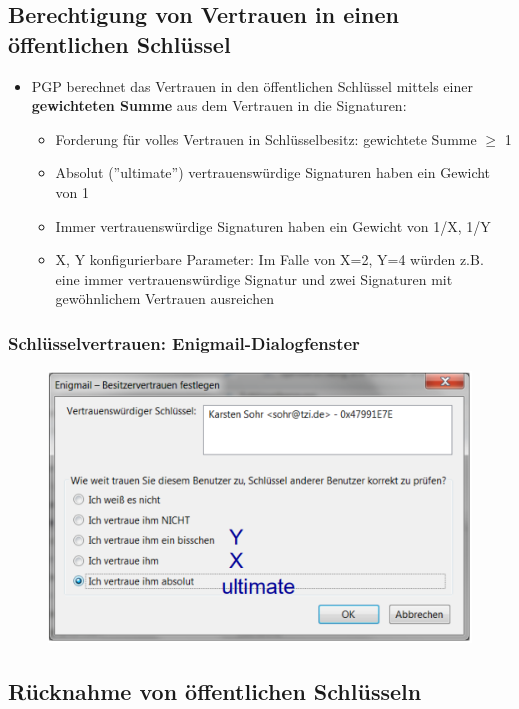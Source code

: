 \documentclass[openany]{book}
\begin{document}
\subsection{Berechtigung von Vertrauen in einen öffentlichen Schlüssel}

\begin{itemize}
    \item PGP berechnet das Vertrauen in den öffentlichen Schlüssel mittels einer \textbf{gewichteten Summe} aus dem Vertrauen in die Signaturen:
    \begin{itemize}
        \item Forderung für volles Vertrauen in Schlüsselbesitz: gewichtete Summe $\geq$ 1
        \item Absolut (''ultimate'') vertrauenswürdige Signaturen haben ein Gewicht von 1
        \item Immer vertrauenswürdige Signaturen haben ein Gewicht von 1/X, 1/Y
        \item X, Y konfigurierbare Parameter: Im Falle von X=2, Y=4 würden z.B. eine immer vertrauenswürdige Signatur und zwei Signaturen mit gewöhnlichem Vertrauen ausreichen
    \end{itemize}
\end{itemize}

\subsubsection{Schlüsselvertrauen: Enigmail-Dialogfenster}

\begin{figure}[h!]
    \centering
    \includegraphics[width=0.85\linewidth]{Pics/Enigmail.PNG}
\end{figure} 

\subsection{Rücknahme von öffentlichen Schlüsseln}
\end{document}
